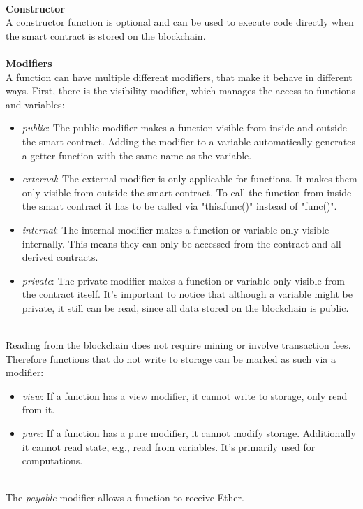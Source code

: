 \leavevmode
\\
\textbf{Constructor}\\
A constructor function is optional and can be used to execute code directly when the smart contract is stored on the blockchain\cite{doc-constructor}.
\\\\
\textbf{Modifiers}\\
A function can have multiple different modifiers, that make it behave in different ways\cite{doc-modifiers}.
First, there is the visibility modifier, which manages the access to functions and variables:
\begin{itemize}
  \item \textit{public}: The public modifier makes a function visible from inside and outside the smart contract.
  Adding the modifier to a variable automatically generates a getter function with the same name as the variable.
  \item \textit{external}: The external modifier is only applicable for functions.
  It makes them only visible from outside the smart contract.
  To call the function from inside the smart contract it has to be called via "this.func()" instead of "func()".
  \item \textit{internal}: The internal modifier makes a function or variable only visible internally.
  This means they can only be accessed from the contract and all derived contracts.
  \item \textit{private}: The private modifier makes a function or variable only visible from the contract itself.
  It's important to notice that although a variable might be private, it still can be read, since all data stored on the blockchain is public.
\end{itemize} 
\leavevmode
\\
Reading from the blockchain does not require mining or involve transaction fees.
Therefore functions that do not write to storage can be marked as such via a modifier:
\begin{itemize}
  \item \textit{view}: If a function has a view modifier, it cannot write to storage, only read from it.
  \item \textit{pure}: If a function has a pure modifier, it cannot modify storage.
  Additionally it cannot read state, e.g., read from variables.
  It's primarily used for computations.
\end{itemize}
\leavevmode
\\
The \textit{payable} modifier allows a function to receive Ether.
